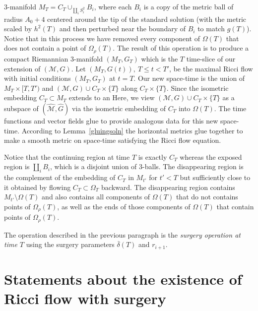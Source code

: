 $3$-manifold $M_T=C_T\cup_{\coprod_iS^2_i} B_i$, where each $B_i$ is a copy of the
metric ball of radius $A_0+4$ centered around the tip of the standard solution
 (with the metric scaled by
$h^2(T)$ and then perturbed near the boundary of $B_i$ to
%
match $g(T)$). Notice that in this process we have removed every
component of $\Omega(T)$ that does not contain a point of
$\Omega_\rho(T)$. The result of this operation is to produce a
compact Riemannian $3$-manifold $(M_T,G_T)$ which is the $T$
time-slice of our extension of $({\mathcal M},G)$. Let $(M_T,G(t)),\
T\le t<T'$, be the maximal Ricci flow with initial conditions
$(M_T,G_T)$ at $t=T$. Our new space-time is the union of
$M_T\times [T,T')$ and $({\mathcal M},G)\cup C_T\times \{T\}$  along $C_T\times \{T\}$.
Since the isometric embedding  $C_T\subset M_T$ extends to an
Here, we view $({\mathcal M},G)\cup C_T\times \{T\}$ as a subspace
of $(\widehat{\mathcal M},\widehat G)$ via the
isometric embedding of $C_T$ into $\Omega(T)$. The time functions
and vector fields glue to provide analogous data for this new
space-time. According to Lemma~\ref{gluingsoln} the horizontal
metrics glue together to make a smooth metric on space-time
satisfying the Ricci flow equation.


Notice that the continuing region at time $T$ is exactly $C_T$
whereas the exposed region is $\coprod_iB_i$, which is a disjoint
union of $3$-balls. The disappearing region is the complement of
the embedding of $C_T$ in $M_{t'}$ for $t'<T$ but sufficiently close to it obtained by
flowing $C_T\subset \Omega_T$ backward. The
disappearing region contains $M_{t'}\setminus \Omega(T)$ and also
contains all components of $\Omega(T)$ that do not contains points
of $\Omega_\rho(T)$, as well as the ends of those components of
$\Omega(T)$ that contain points of $\Omega_\rho(T)$.

\begin{definition}
\label{def:surgery-operation}
The operation described in the previous paragraph is the {\em surgery
operation at time $T$} using the surgery parameters $\overline\delta(T)$ and $r_{i+1}$.
\end{definition}


\section{Statements about the existence of Ricci flow with
surgery}

